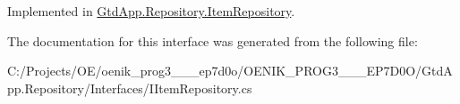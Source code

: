 Implemented in \mbox{\hyperlink{class_gtd_app_1_1_repository_1_1_item_repository_a304576bc3ab1770c40e5caa41ebbf218}{Gtd\+App.\+Repository.\+Item\+Repository}}.



The documentation for this interface was generated from the following file\+:\begin{DoxyCompactItemize}
\item 
C\+:/\+Projects/\+O\+E/oenik\+\_\+prog3\+\_\+\_\+\_\+ep7d0o/\+O\+E\+N\+I\+K\+\_\+\+P\+R\+O\+G3\+\_\+\_\+\_\+\+E\+P7\+D0\+O/\+Gtd\+App.\+Repository/\+Interfaces/I\+Item\+Repository.\+cs\end{DoxyCompactItemize}
